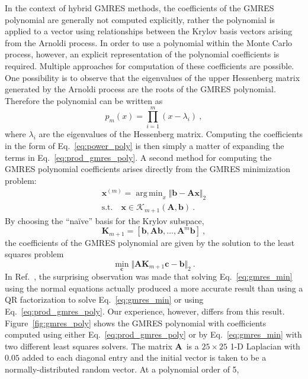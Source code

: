 \documentclass[10pt]{article}
\newcommand{\bx}{\ensuremath{\mathbf{x}}}
\newcommand{\bb}{\ensuremath{\mathbf{b}}}
\newcommand{\bc}{\ensuremath{\mathbf{c}}}
\newcommand{\bA}{\ensuremath{\mathbf{A}}}
\newcommand{\bK}{\ensuremath{\mathbf{K}}}
\newcommand{\calK}{\ensuremath{\mathcal{K}}}
\DeclareMathOperator*{\argmin}{arg\,min}
\begin{document}
In the context of hybrid GMRES methods, the coefficients of the GMRES polynomial
are generally not computed explicitly, rather the polynomial is applied
to a vector using relationships between the Krylov basis vectors arising from
the Arnoldi process.  In order to use a polynomial within the Monte Carlo
process, however, an explicit representation of the polynomial coefficients
is required.  Multiple approaches for computation of these coefficients
are possible.  One possibility is to observe that the eigenvalues of the
upper Hessenberg matrix generated by the Arnoldi process are the roots of the
GMRES polynomial.  Therefore the polynomial can be written as
\begin{equation}
p_m(x) = \prod_{i=1}^{m} (x - \lambda_i) \:, \label{eq:prod_gmres_poly}
\end{equation}
where $\lambda_i$ are the eigenvalues of the Hessenberg matrix.
Computing the coefficients in the form of Eq.~\eqref{eq:power_poly}
is then simply a matter of expanding the terms in Eq.~\eqref{eq:prod_gmres_poly}.
A second method for computing the GMRES polynomial coefficients arises
directly from the GMRES minimization problem:
\begin{align}
\bx^{(m)} = \argmin_x \Vert \bb - \bA \bx \Vert_2 \\
\text{s.t.} \quad \bx \in \calK_{m+1}(\bA,\bb) \:.
\end{align}
By choosing the ``na\"ive'' basis for the Krylov subspace,
\begin{equation}
\bK_{m+1} = \left[ \bb, \bA \bb, \ldots, \bA^m \bb \right] \:,
\end{equation}
the coefficients of the GMRES polynomial are given by the solution to
the least squares problem
\begin{equation}
\min_{\bc} \Vert \bA \bK_{m+1} \bc - \bb \Vert_2 \:. \label{eq:gmres_min}
\end{equation}
In Ref.~\cite{liu_14}, the surprising observation was made that solving
Eq.~\eqref{eq:gmres_min} using the normal equations actually produced
a more accurate result than using a QR factorization to solve
Eq.~\eqref{eq:gmres_min} or using Eq.~\eqref{eq:prod_gmres_poly}.
Our experience, however, differs from this result.
Figure~\ref{fig:gmres_poly} shows the GMRES polynomial with coefficients
computed using either Eq.~\eqref{eq:prod_gmres_poly} or by
Eq.~\eqref{eq:gmres_min} with two different least squares solvers.
The matrix \bA\ is a $25 \times 25$ 1-D Laplacian with $0.05$ added
to each diagonal entry and the initial vector is taken to be a
normally-distributed random vector.  At a polynomial order of 5,
\end{document}
